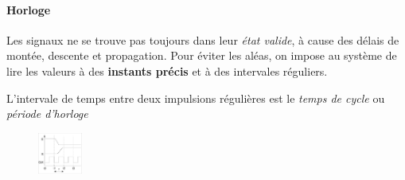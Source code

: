 \documentclass{report}
\begin{document}
\begin{multicols*}{3}
   \paragraph{Horloge}
   Les signaux ne se trouve pas toujours dans leur 
   \textit{état valide}, à cause des délais de montée, descente 
   et propagation. Pour éviter les aléas, on impose au 
   système de lire les valeurs à des \textbf{instants précis}  
   et à des intervales réguliers. 

   L'intervale de temps entre deux impulsions régulières 
   est le \textit{temps de cycle} ou \textit{période d'horloge}    


   \begin{figure}[H]
    \begin{center}
      \includegraphics[width=0.13\textwidth]{ExempleHorloge.png}
    \end{center}
   \end{figure}
   
   


   







  

    

    
    







    \end{multicols*}
\end{document}
